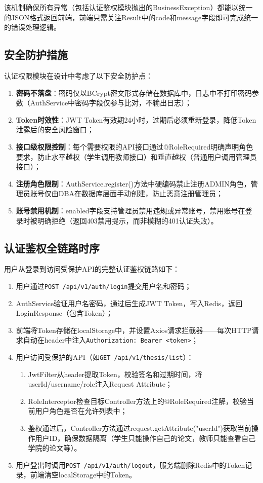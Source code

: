 \documentclass{../softeng}
\begin{document}
该机制确保所有异常（包括认证鉴权模块抛出的BusinessException）都能以统一的JSON格式返回前端，前端只需关注Result中的code和message字段即可完成统一的错误处理逻辑。

\subsection{安全防护措施}

认证权限模块在设计中考虑了以下安全防护点：

\begin{enumerate}
    \item \textbf{密码不落盘}：密码仅以BCrypt密文形式存储在数据库中，日志中不打印密码参数（AuthService中密码字段仅参与比对，不输出日志）；
    \item \textbf{Token时效性}：JWT Token有效期24小时，过期后必须重新登录，降低Token泄露后的安全风险窗口；
    \item \textbf{接口级权限控制}：每个需要权限的API接口通过@RoleRequired明确声明角色要求，防止水平越权（学生调用教师接口）和垂直越权（普通用户调用管理员接口）；
    \item \textbf{注册角色限制}：AuthService.register()方法中硬编码禁止注册ADMIN角色，管理员账号仅由DBA在数据库层面手动创建，防止恶意注册管理员；
    \item \textbf{账号禁用机制}：enabled字段支持管理员禁用违规或异常账号，禁用账号在登录时被明确拒绝（返回403禁用提示，而非模糊的401认证失败）。
\end{enumerate}

\subsection{认证鉴权全链路时序}

用户从登录到访问受保护API的完整认证鉴权链路如下：

\begin{enumerate}
    \item 用户通过\verb|POST /api/v1/auth/login|提交用户名和密码；
    \item AuthService验证用户名密码，通过后生成JWT Token，写入Redis，返回LoginResponse（包含Token）；
    \item 前端将Token存储在localStorage中，并设置Axios请求拦截器——每次HTTP请求自动在header中注入\verb|Authorization: Bearer <token>|；
    \item 用户访问受保护的API（如\verb|GET /api/v1/thesis/list|）：
    \begin{enumerate}
        \item[(a)] JwtFilter从header提取Token，校验签名和过期时间，将userId/username/role注入Request Attribute；
        \item[(b)] RoleInterceptor检查目标Controller方法上的@RoleRequired注解，校验当前用户角色是否在允许列表中；
        \item[(c)] 鉴权通过后，Controller方法通过request.getAttribute("userId")获取当前操作用户ID，确保数据隔离（学生只能操作自己的论文，教师只能查看自己学院的论文等）。
    \end{enumerate}
    \item 用户登出时调用\verb|POST /api/v1/auth/logout|，服务端删除Redis中的Token记录，前端清空localStorage中的Token。
\end{enumerate}
\end{document}
